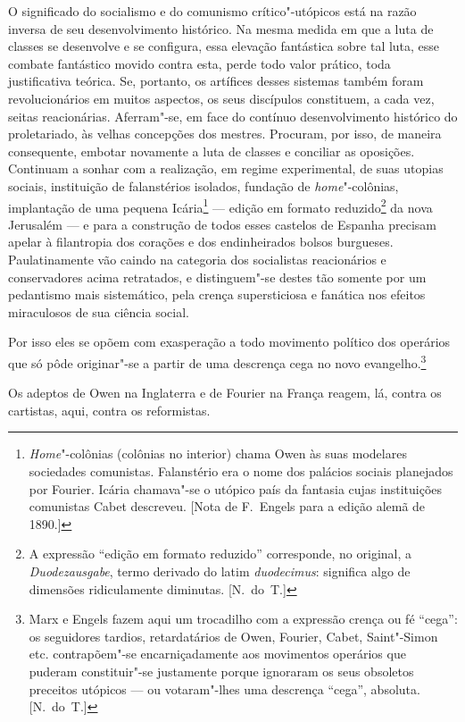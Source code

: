 O significado do socialismo e do comunismo crítico"-utópicos
está na razão inversa de seu desenvolvimento histórico. Na mesma medida
em que a luta de classes se desenvolve e se configura, essa elevação
fantástica sobre tal luta, esse combate fantástico movido contra esta,
perde todo valor prático, toda justificativa teórica. Se, portanto, os
artífices desses sistemas também foram revolucionários em muitos
aspectos, os seus discípulos constituem, a cada vez, seitas reacionárias.
Aferram"-se, em face do contínuo desenvolvimento histórico do
proletariado, às velhas concepções dos mestres. Procuram, por isso, de
maneira consequente, embotar novamente a luta de classes e conciliar as
oposições. Continuam a sonhar com a realização, em regime experimental,
de suas utopias sociais, instituição de falanstérios isolados, fundação
de \textit{home}"-colônias, implantação de uma pequena
Icária\footnote{ \textit{Home}"-colônias (colônias no
interior) chama Owen às suas modelares sociedades comunistas.
Falanstério era o nome dos palácios sociais planejados por Fourier.
Icária chamava"-se o utópico país da fantasia cujas instituições
comunistas Cabet descreveu. [Nota de F.~Engels para a edição alemã de
1890.]} --- edição em formato reduzido\footnote{ A expressão “edição em formato reduzido” corresponde, no original, a \textit{Duodezausgabe}, termo derivado do
latim \textit{duodecimus}: significa algo de dimensões ridiculamente
diminutas. [N.~do~T.]} da nova Jerusalém  ---  e para a construção de todos esses 
castelos de Espanha precisam apelar à filantropia dos corações e dos
endinheirados bolsos burgueses. Paulatinamente vão caindo na categoria
dos socialistas reacionários e conservadores acima retratados, e
distinguem"-se destes tão somente por um pedantismo mais sistemático,
pela crença supersticiosa e fanática nos efeitos miraculosos de sua
ciência social.

Por isso eles se opõem com exasperação a todo movimento político
dos operários que só pôde originar"-se a partir de uma descrença cega
no novo evangelho.\footnote{ Marx e Engels fazem aqui um trocadilho com a expressão crença ou fé “cega”: os seguidores tardios, retardatários de Owen, 
Fourier, Cabet, Saint"-Simon etc. contrapõem"-se encarniçadamente aos movimentos 
operários que puderam constituir"-se justamente porque ignoraram 
os seus obsoletos preceitos utópicos  ---  ou votaram"-lhes uma descrença 
“cega”, absoluta. [N.~do~T.]}

Os adeptos de Owen na Inglaterra e de Fourier na França reagem, lá,
contra os cartistas, aqui, contra os reformistas.

